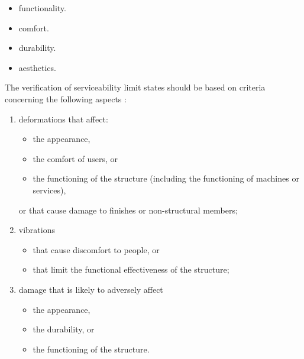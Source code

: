 \begin{itemize}
\item functionality.
\item comfort.
\item durability.
\item aesthetics.
\end{itemize}

The verification of serviceability limit states should be based on criteria concerning the following aspects :
\begin{enumerate}
\item deformations that affect:
\begin{itemize}
\item the appearance,
\item the comfort of users, or
\item the functioning of the structure (including the functioning of machines or services),
\end{itemize}
or that cause damage to finishes or non-structural members;

\item vibrations 
\begin{itemize}
\item that cause discomfort to people, or
\item that limit the functional effectiveness of the structure;
\end{itemize}
\item damage that is likely to adversely affect
\begin{itemize}
\item the appearance,
\item the durability, or
\item the functioning of the structure.
\end{itemize}
\end{enumerate}
